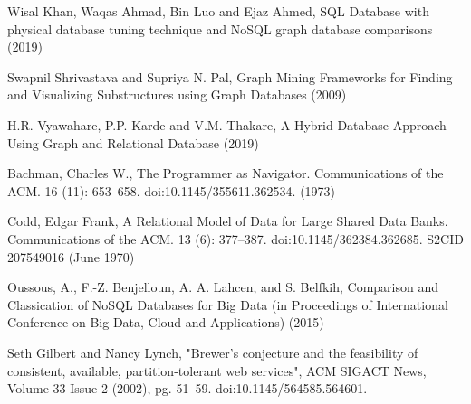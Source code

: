 \documentclass[10pt,        %
               a4paper,     %
               journal,     %
               ]{IEEEtran}
\begin{document}

%
%
\begin{thebibliography}{3}


Wisal Khan, Waqas Ahmad, Bin Luo and Ejaz Ahmed, SQL Database with physical database tuning technique and NoSQL graph database comparisons
(2019)

Swapnil Shrivastava and Supriya N. Pal, Graph Mining Frameworks for Finding and Visualizing Substructures using Graph Databases
(2009)

H.R. Vyawahare, P.P. Karde and V.M. Thakare, A Hybrid Database Approach Using Graph and Relational Database
(2019)

Bachman, Charles W., The Programmer as Navigator. Communications of the ACM. 16 (11): 653–658. doi:10.1145/355611.362534.
(1973)

Codd, Edgar Frank, A Relational Model of Data for Large Shared Data Banks. Communications of the ACM. 13 (6): 377–387. doi:10.1145/362384.362685. S2CID 207549016
(June 1970)

Oussous, A., F.-Z. Benjelloun, A. A. Lahcen, and S. Belfkih, Comparison and Classication of NoSQL Databases for Big Data (in Proceedings of International Conference on Big Data, Cloud and Applications)
(2015)

Seth Gilbert and Nancy Lynch, "Brewer's conjecture and the feasibility of consistent, available, partition-tolerant web services", ACM SIGACT News, Volume 33 Issue 2 (2002), pg. 51–59. doi:10.1145/564585.564601.

\end{thebibliography}
\end{document}
